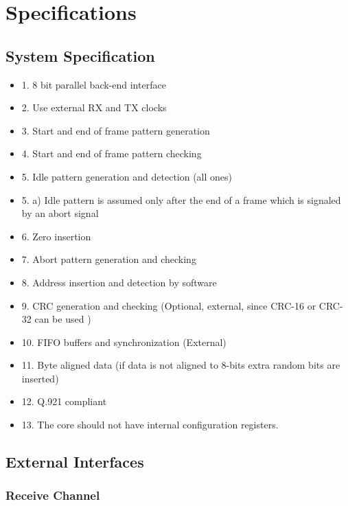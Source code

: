 \documentclass[a4paper,11pt]{article}
\begin{document}
\section{Specifications}

\subsection{System Specification}
\begin{itemize}
\item 1. 8 bit parallel back-end interface
\item 2. Use external RX and TX clocks
\item 3. Start and end of frame pattern generation
\item 4. Start and end of frame pattern checking
\item 5. Idle pattern generation and detection (all ones)
\item 5. a)  Idle pattern is assumed only after the end of a frame which is signaled by an abort signal
\item 6. Zero insertion
\item 7. Abort pattern generation and checking
\item 8. Address insertion and detection by software
\item 9. CRC generation and checking (Optional, external, since CRC-16 or CRC-32 can be used )
\item 10. FIFO buffers and synchronization (External)
\item 11. Byte aligned data (if data is not aligned to 8-bits extra random bits are inserted)
\item 12. Q.921 compliant
\item 13. The core should not have internal configuration registers.
\end{itemize}

\subsection{External Interfaces}

\subsubsection{Receive Channel}
\end{document}
